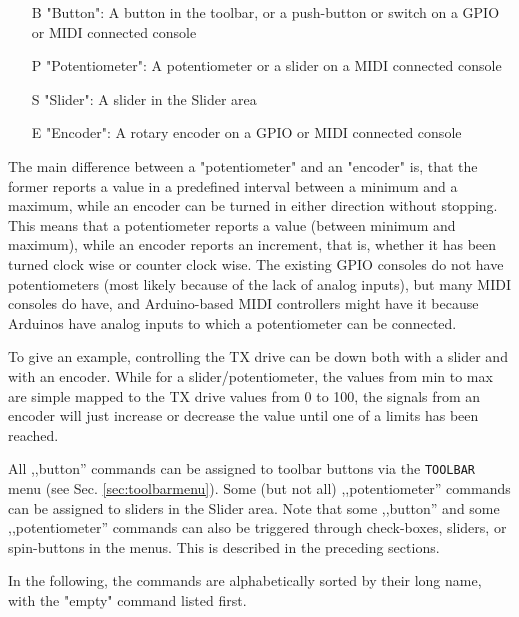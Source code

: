 \documentclass[12pt]{book}
\def\bltt#1{\texttt{\color{blue}#1}}
\begin{document}
\begin{itemize}[font=\texttt, left=0pt]
\item[B] {"Button": A button in the toolbar, or a push-button or switch on a GPIO or MIDI connected console}
\item[P] {"Potentiometer": A potentiometer or a slider on a MIDI connected console}
\item[S] {"Slider": A slider in the Slider area}
\item[E] {"Encoder": A rotary encoder on a GPIO or MIDI connected console}
\end{itemize}

The main difference between a "potentiometer" and an "encoder" is, that the former reports a
value in a predefined interval between a minimum and a maximum,
while
an encoder can be turned in either direction without stopping. This means that a potentiometer
reports a value (between minimum and maximum), while an encoder reports an increment,
that is, whether it has been turned clock wise or counter clock wise.
The existing GPIO consoles do not have potentiometers (most likely because of the lack of analog inputs),
but many MIDI consoles do have, and Arduino-based MIDI controllers might have it because Arduinos have
analog inputs to which a potentiometer can be connected.

To give an example, controlling the TX drive can be down both with a slider and with an encoder. While for
a slider/potentiometer, the values from min to max are simple mapped to the TX drive values from 0 to 100,
the signals from an encoder will just increase or decrease the value until one of a limits has been reached.

All ,,button'' commands can be assigned to toolbar buttons via the \bltt{TOOLBAR} menu
(see Sec. \ref{sec:toolbarmenu}). Some (but not all) ,,potentiometer'' commands can
be assigned to sliders in the Slider area.
Note that some ,,button'' and some ,,potentiometer'' commands
can also be triggered through check-boxes, sliders, or spin-buttons in the menus.
This is described in the preceding sections.

In the following, the commands are alphabetically sorted by their long name, with the "empty" command listed
first.

\renewcommand{\belowrulesep}{0pt}
\renewcommand{\aboverulesep}{0pt}
\def\phcommand#1#2#3#4{
\begin{center}
\begin{tabular}{|p{7cm}|p{3cm}|p{1cm}|}
\toprule
\bltt{\large #1} & \texttt{\large #2} & \texttt{\large #3}$\phantom{\Big|}$ \\\cline{1-3}
\multicolumn{3}{|p{\textwidth}|}{#4} \\
\bottomrule
\end{tabular}
\end{center}
}
\end{document}
